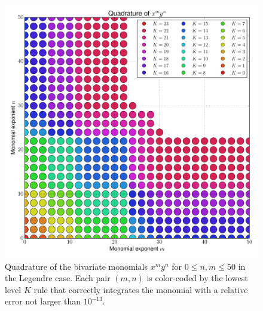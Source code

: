 \documentclass[a4paper,10pt]{article}
\begin{document}
\clearpage

\begin{figure}
  \centering
  \includegraphics[width=\linewidth]{./img/monomial_errors_legendre_2D.pdf}
  \caption{Quadrature of the bivariate monomials $x^m y^n$ for $0 \leq n, m \leq 50$
  in the Legendre case.
  Each pair $(m,n)$ is color-coded by the lowest level $K$ rule that correctly
  integrates the monomial with a relative error not larger than $10^{-13}$.}
  \label{fig:monomial_errors_legendre_2D}
\end{figure}
\end{document}
